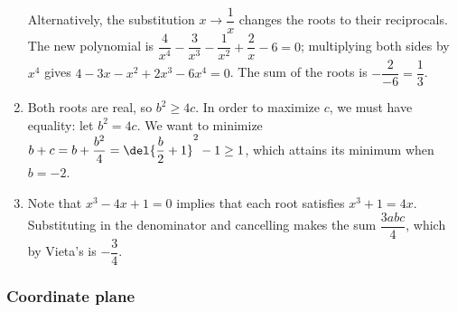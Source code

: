 \documentclass[10pt,paper=letter]{scrartcl}
\begin{document}
\begin{enumerate}
Alternatively, the substitution $x \to \dfrac1x$ changes the roots to their reciprocals. The new polynomial is $\dfrac4{x^4} - \dfrac3{x^3} - \dfrac1{x^2} + \dfrac2x - 6 = 0$; multiplying both sides by $x^4$ gives $4 - 3x - x^2 + 2x^3 - 6x^4 = 0$. The sum of the roots is $-\dfrac2{-6} = \dfrac13$.

\item Both roots are real, so $b^2 \geq 4c$. In order to maximize $c$, we must have equality: let $b^2 = 4c$. We want to minimize $b + c = b + \dfrac{b^2}4 = \del{\dfrac b2 + 1}^2 -1 \geq 1$, which attains its minimum when $b = -2$.

\item Note that $x^3 - 4x + 1 = 0$ implies that each root satisfies $x^3 + 1 = 4x$. Substituting in the denominator and cancelling makes the sum $\dfrac{3abc}4$, which by Vieta's is $-\dfrac34$.

\end{enumerate}

\subsubsection*{Coordinate plane}
\end{document}
